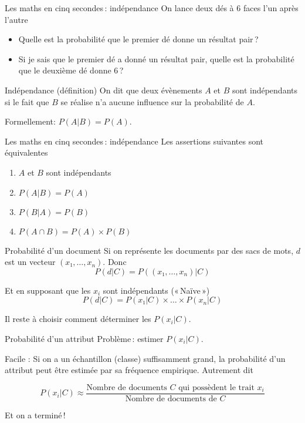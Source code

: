 \documentclass[hyperref={unicode}, xcolor={svgnames}, french]{beamer}
\newcommand{\itpause}{%
	\addtocounter{beamerpauses}{-1}%
	\pause
}
\begin{document}
\begin{frame}{Les maths en cinq secondes : indépendance}
	On lance deux dés à \num{6} faces l'un après l'autre

	\begin{itemize}
		\item<+-> Quelle est la probabilité que le premier dé donne un résultat pair ?
		\item<+-> Si je sais que le premier dé a donné un résultat pair, quelle est la probabilité que le deuxième dé donne \num{6} ?
	\end{itemize}
	\itpause

	\begin{block}{Indépendance (définition)}
		On dit que deux évènements $A$ et $B$ sont indépendants si le fait que $B$ se réalise n'a aucune influence sur la probabilité de $A$.

		Formellement: $P(A|B)=P(A)$.
	\end{block}
\end{frame}


\begin{frame}{Les maths en cinq secondes : indépendance}
	Les assertions suivantes sont équivalentes
	\begin{enumerate}[<+->]
		\item $A$ et $B$ sont indépendants
		\item $P(A|B)=P(A)$
		\item $P(B|A)=P(B)$
		\item $P(A∩B) = P(A)×P(B)$
	\end{enumerate}
\end{frame}


\begin{frame}{Probabilité d'un document}
    Si on représente les documents par des sacs de mots, $d$ est un vecteur $(x₁, …, x_n)$.
    Donc
    \begin{equation}
        P(d|C) = P((x₁, …, x_n)|C)
    \end{equation}

    Et en supposant que les $x_i$ sont indépendants (« Naïve »)
    \begin{equation}
        P(d|C) = P(x₁|C)×…×P(x_n|C)
    \end{equation}

    Il reste à choisir comment déterminer les $P(x_i|C)$.
\end{frame}

\begin{frame}{Probabilité d'un attribut}
	Problème : estimer $P(x_i|C)$.

	\pause
	Facile : Si on a un échantillon (classe) suffisamment grand, la probabilité d'un attribut peut être estimée par sa fréquence empirique. Autrement dit

	\pause

	\begin{equation}
		P(x_i|C) ≈ \frac{\text{Nombre de documents $C$ qui possèdent le trait $x_i$}}{\text{Nombre de documents de $C$}}
	\end{equation}

	\pause
	Et on a terminé !
\end{frame}
\end{document}
